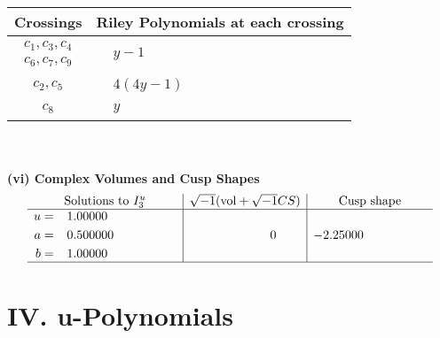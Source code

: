 \documentclass[1p]{elsarticle_modified}
\theoremstyle{definition}
\newcommand{\I}{\sqrt{-1}}
\begin{document}
\begin{tabular}{m{50pt}|m{274pt}}
Crossings & \hspace{64pt}Riley Polynomials at each crossing \\
\hline $$\begin{aligned}c_{1},c_{3},c_{4}\\c_{6},c_{7},c_{9}\end{aligned}$$&$\begin{aligned}
&y-1
\end{aligned}$\\
\hline $$\begin{aligned}c_{2},c_{5}\end{aligned}$$&$\begin{aligned}
&4(4 y-1)
\end{aligned}$\\
\hline $$\begin{aligned}c_{8}\end{aligned}$$&$\begin{aligned}
&y
\end{aligned}$\\
\hline
\end{tabular}\\~\\
\newpage\flushleft \textbf{(vi) Complex Volumes and Cusp Shapes}
$$\begin{array}{c|c|c}  
\text{Solutions to }I^u_{3}& \I (\text{vol} + \sqrt{-1}CS) & \text{Cusp shape}\\
 \hline 
\begin{aligned}
u &= \phantom{-}1.00000\phantom{ +0.000000I} \\
a &= \phantom{-}0.500000\phantom{ +0.000000I} \\
b &= \phantom{-}1.00000\phantom{ +0.000000I}\end{aligned}
 & \phantom{-0.000000 } 0 & -2.25000\phantom{ +0.000000I}\\
 \hline 
 \end{array}$$\newpage
\newpage\renewcommand{\arraystretch}{1}
\centering \section*{ IV. u-Polynomials}
\end{document}

